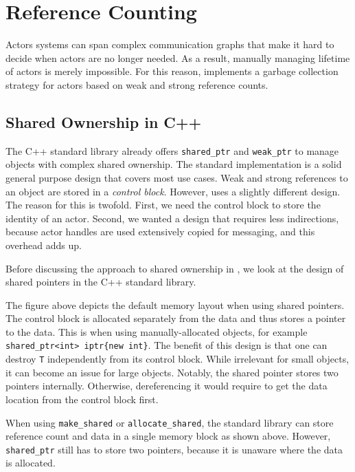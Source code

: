 \section{Reference Counting}
\label{reference-counting}

Actors systems can span complex communication graphs that make it hard to decide when actors are no longer needed. As a result, manually managing lifetime of actors is merely impossible. For this reason, \lib implements a garbage collection strategy for actors based on weak and strong reference counts.

\subsection{Shared Ownership in C++}

The C++ standard library already offers \lstinline^shared_ptr^ and \lstinline^weak_ptr^ to manage objects with complex shared ownership. The standard implementation is a solid general purpose design that covers most use cases. Weak and strong references to an object are stored in a \emph{control block}. However, \lib uses a slightly different design. The reason for this is twofold. First, we need the control block to store the identity of an actor. Second, we wanted a design that requires less indirections, because actor handles are used extensively copied for messaging, and this overhead adds up.

Before discussing the approach to shared ownership in \lib, we look at the design of shared pointers in the C++ standard library.


The figure above depicts the default memory layout when using shared pointers. The control block is allocated separately from the data and thus stores a pointer to the data. This is when using manually-allocated objects, for example \lstinline^shared_ptr<int> iptr{new int}^. The benefit of this design is that one can destroy \lstinline^T^ independently from its control block. While irrelevant for small objects, it can become an issue for large objects. Notably, the shared pointer stores two pointers internally. Otherwise, dereferencing it would require to get the data location from the control block first.


When using \lstinline^make_shared^ or \lstinline^allocate_shared^, the standard library can store reference count and data in a single memory block as shown above. However, \lstinline^shared_ptr^ still has to store two pointers, because it is unaware where the data is allocated.


